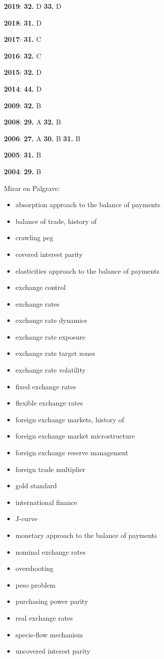 \documentclass{nuevotema}
\begin{document}
\notas

\textbf{2019}: \textbf{32.} D \textbf{33.} D

\textbf{2018}: \textbf{31.} D

\textbf{2017}: \textbf{31.} C

\textbf{2016}: \textbf{32.} C

\textbf{2015}: \textbf{32.} D

\textbf{2014}: \textbf{44.} D

\textbf{2009}: \textbf{32.} B

\textbf{2008}: \textbf{29.} A \textbf{32.} B

\textbf{2006}: \textbf{27.} A \textbf{30.} B \textbf{31.} B

\textbf{2005}: \textbf{31.} B

\textbf{2004}: \textbf{29.} B

\bibliografia
 
Mirar en Palgrave:
\begin{itemize}
	\item absorption approach to the balance of payments
	\item balance of trade, history of
	\item crawling peg
	\item covered interest parity
	\item elasticities approach to the balance of payments
	\item exchange control
	\item exchange rates
	\item exchange rate dynamics
	\item exchange rate exposure
	\item exchange rate target zones
	\item exchange rate volatility
	\item fixed exchange rates
	\item flexible exchange rates
	\item foreign exchange markets, history of
	\item foreign exchange market microstructure
	\item foreign exchange reserve management
	\item foreign trade multiplier
	\item gold standard
	\item international finance
	\item J-curve
	\item monetary approach to the balance of payments
	\item nominal exchange rates
	\item overshooting
	\item peso problem
	\item purchasing power parity
	\item real exchange rates
	\item specie-flow mechanism
	\item uncovered interest parity
\end{itemize}
\end{document}
